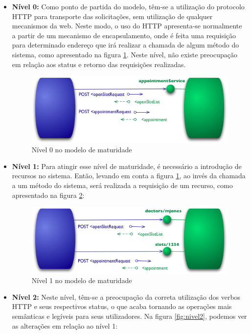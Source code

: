 \begin{itemize}
    \item \textbf{Nível 0:} Como ponto de partida do modelo, têm-se a utilização do protocolo HTTP para transporte das solicitações, sem utilização de qualquer mecanismos da web. Neste modo, o uso do HTTP apresenta-se normalmente a partir de um mecanismo de encapsulamento, onde é feita uma requisição para determinado endereço que irá realizar a chamada de algum método do sistema, como apresentado na figura \ref{fig:nivel0}. Neste nível, não existe preocupação em relação aos status e retorno das requisições realizadas.
    
    \begin{figure}[H]
    	\centering
    	\includegraphics[width=0.7\linewidth]{imagens/level0.png}
    	\caption[Nível 0 no modelo de maturidade]{Nível 0 no modelo de maturidade \cite{fowler2010richardson}}
	    \label{fig:nivel0}
    \end{figure}
    
    \item \textbf{Nível 1:} Para atingir esse nível de maturidade, é necessário a introdução de recursos no sistema. Então, levando em conta a figura \ref{fig:nivel0}, ao invés da chamada a um método do sistema, será realizada a requisição de um recurso, como apresentado na figura \ref{fig:nivel1}:
    
    \begin{figure}[H]
    	\centering
    	\includegraphics[width=0.7\linewidth]{imagens/level1.png}
    	\caption[Nível 1 no modelo de maturidade]{Nível 1 no modelo de maturidade \cite{fowler2010richardson}}
	    \label{fig:nivel1}
    \end{figure}
    
    \item \textbf{Nível 2:} Neste nível, têm-se a preocupação da correta utilização dos verbos HTTP e seus respectivos status, o que acaba tornando as operações mais semânticas e legíveis para seus utilizadores. Na figura \ref{fig:nivel2}, podemos ver as alterações em relação ao nível 1:
    

\end{itemize}
